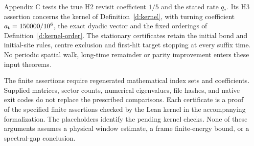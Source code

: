 Appendix C tests the true H2 revisit coefficient \(1/5\) and
the stated rate \(q_*\). Its H3 assertion concerns the kernel of
Definition~\ref{d:kernel}, with turning coefficient
\(a_{\rm t}=150000/10^6\), the exact dyadic vector and the
fixed orderings of Definition~\ref{d:kernel-order}. The stationary
certificates retain the initial bond and initial-site rules,
centre exclusion and first-hit target stopping at every suffix
time. No periodic spatial walk, long-time remainder or parity
improvement enters these input theorems.

The finite assertions require regenerated mathematical index sets
and coefficients. Supplied matrices, sector counts, numerical
eigenvalues, file hashes, and native exit codes do not replace
the prescribed comparisons. Each certificate is a proof of the
specified finite assertions checked by the Lean kernel in the
accompanying formalization. The placeholders identify the pending
kernel checks. None of these arguments assumes a physical window
estimate, a frame finite-energy bound, or a spectral-gap conclusion.

